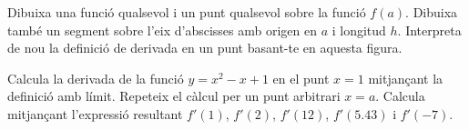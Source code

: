 \begin{mylist}

\exer  Dibuixa una funció qualsevol i un punt qualsevol sobre la funció $f(a)$. Dibuixa també un segment sobre l'eix d'abscisses amb origen en  $a$ i longitud $h$. 
Interpreta de nou la definició de derivada en un punt basant-te en aquesta figura.


\exer  Calcula la derivada de la funció $y= x^2 - x+ 1$ en el punt $x=1$ mitjançant la definició amb límit. 
Repeteix el càlcul per un punt arbitrari $x=a$. 
Calcula mitjançant l'expressió resultant $f'(1)$, $f'(2)$, $f'(12)$, $f'(5.43)$ i $f'(-7)$.

\end{mylist}

 
 


